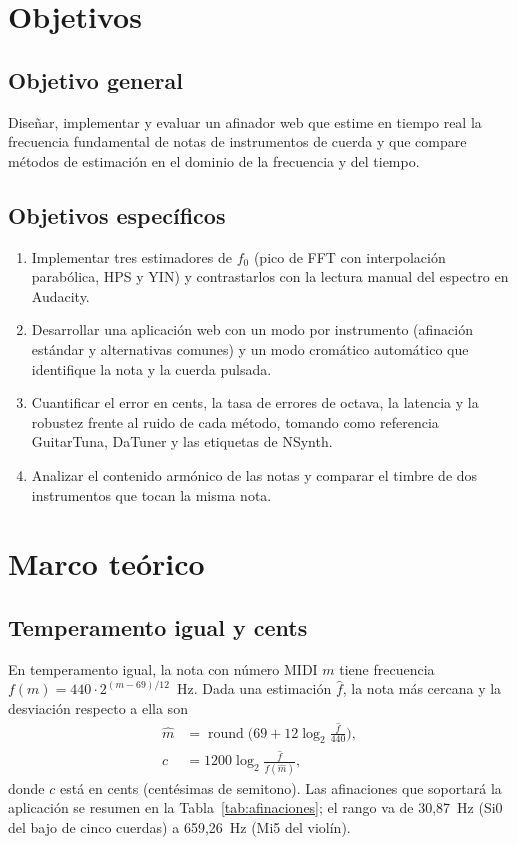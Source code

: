 \documentclass[conference,a4paper]{IEEEtran}
\newcommand{\fo}{f_0}
\begin{document}
\section{Objetivos}
\subsection{Objetivo general}
Diseñar, implementar y evaluar un afinador web que estime en tiempo real la frecuencia fundamental de notas de instrumentos de cuerda y que compare métodos de estimación en el dominio de la frecuencia y del tiempo.

\subsection{Objetivos específicos}
\begin{enumerate}
\item Implementar tres estimadores de $\fo$ (pico de FFT con interpolación parabólica, HPS y YIN) y contrastarlos con la lectura manual del espectro en Audacity.
\item Desarrollar una aplicación web con un modo por instrumento (afinación estándar y alternativas comunes) y un modo cromático automático que identifique la nota y la cuerda pulsada.
\item Cuantificar el error en cents, la tasa de errores de octava, la latencia y la robustez frente al ruido de cada método, tomando como referencia GuitarTuna, DaTuner y las etiquetas de NSynth.
\item Analizar el contenido armónico de las notas y comparar el timbre de dos instrumentos que tocan la misma nota.
\end{enumerate}

\section{Marco teórico}
\subsection{Temperamento igual y cents}
En temperamento igual, la nota con número MIDI $m$ tiene frecuencia $f(m) = 440\cdot 2^{(m-69)/12}$~Hz. Dada una estimación $\hat f$, la nota más cercana y la desviación respecto a ella son
\begin{align}
\hat m &= \operatorname{round}\!\Big(69 + 12\log_2\frac{\hat f}{440}\Big),\\
c &= 1200\log_2\frac{\hat f}{f(\hat m)},
\end{align}
donde $c$ está en cents (centésimas de semitono). Las afinaciones que soportará la aplicación se resumen en la Tabla~\ref{tab:afinaciones}; el rango va de 30,87~Hz (Si0 del bajo de cinco cuerdas) a 659,26~Hz (Mi5 del violín).
\end{document}
